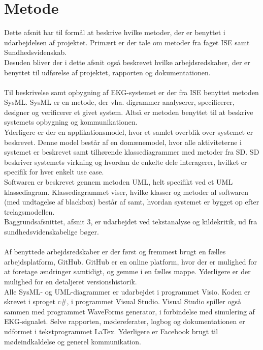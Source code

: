 \section{Metode} 
Dette afsnit har til formål at beskrive hvilke metoder, der er benyttet i udarbejdelsen af projektet. Primært er der tale om metoder fra faget ISE samt Sundhedsvidenskab.\\ 
Desuden bliver der i dette afsnit også beskrevet hvilke arbejdsredskaber, der er benyttet til udførelse af projektet, rapporten og dokumentationen.\\ \\
Til beskrivelse samt opbygning af EKG-systemet er der fra ISE benyttet metoden SysML. SysML er en metode, der vha. digrammer analyserer, specificerer, designer og verificerer et givet system. Altså er metoden benyttet til at beskrive systemets opbygning og kommunikationen. \\ 
Yderligere er der en applikationsmodel, hvor et samlet overblik over systemet er beskrevet. Denne model består af en domænemodel, hvor alle aktiviteterne i systemet er beskrevet samt tilhørende klassediagrammer med metoder fra SD. SD beskriver systemets virkning og hvordan de enkelte dele interagerer, hvilket er specifik for hver enkelt use case.\\ 
Softwaren er beskrevet gennem metoden UML, helt specifikt ved et UML klassediagram. Klassediagrammet viser, hvilke klasser og metoder al softwaren (med undtagelse af blackbox) består af samt, hvordan systemet er bygget op efter trelagsmodellen.\\
Baggrundsafsnittet, afsnit 3, er udarbejdet ved tekstanalyse og kildekritik, ud fra sundhedsvidenskabelige bøger.\\ \\
Af benyttede arbejdsredskaber er der først og fremmest brugt en fælles arbejdsplatform, GitHub. GitHub er en online platform, hvor der er mulighed for at foretage ændringer samtidigt, og gemme i en fælles mappe. Yderligere er der mulighed for en detaljeret versionshistorik.\\
Alle SysML- og UML-diagrammer er udarbejdet i programmet Visio. Koden er skrevet i sproget c\#, i programmet Visual Studio. Visual Studio spiller også sammen med programmet WaveForms generator, i forbindelse med simulering af EKG-signalet. Selve rapporten, mødereferater, logbog og dokumentationen er udformet i tekstprogrammet LaTex. Yderligere er Facebook brugt til mødeindkaldelse og generel kommunikation.



